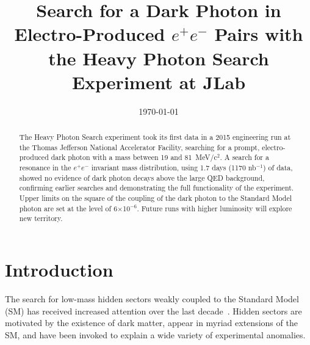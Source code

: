 \documentclass[twocolumn, showpacs, preprintnumbers,prd, superscriptaddress]{revtex4-1}
\newcommand{\mevcc}{MeV/c$^2$}
\newcommand{\pos}{e^{+}}
\newcommand{\ele}{e^{-}}
\newcommand{\epem}{\pos\ele}
\begin{document}

	\title{Search for a Dark Photon in Electro-Produced $\epem$ Pairs 
    	   with the Heavy Photon Search Experiment at JLab}
    
    




    
    \date{\today}
    
    \begin{abstract}
        
        The Heavy Photon Search experiment took its first data in a 2015
        engineering run at the Thomas Jefferson National Accelerator Facility,
        searching for a prompt, electro-produced dark photon with a mass 
        between 19 and 81~\mevcc. A search for a resonance in the $\epem$
        invariant mass distribution, using 1.7 days (1170 nb$^{-1}$) of data, 
        showed no evidence of dark photon decays above the large QED background,
        confirming earlier searches and demonstrating the full functionality of
        the experiment. Upper limits on the square of the coupling of the dark
        photon to the Standard Model photon are set at the level of 
        6$\times$10$^{-6}$. Future runs with higher luminosity will explore new 
        territory. 

	\end{abstract}
	
    
    \maketitle
    
    \section{Introduction}
        
        The search for low-mass hidden sectors weakly coupled to the Standard 
        Model (SM) has received increased attention over the last
        decade~\cite{Hewett:2012ns,Essig:2013lka,Alexzzander:2016aln,
        Battaglieri:2017aum,Jaeckel:2010ni}.   Hidden sectors are motivated by
        the existence of dark matter, appear in myriad extensions of the SM, 
        and have been invoked to explain a wide variety of experimental anomalies.   
\end{document}
